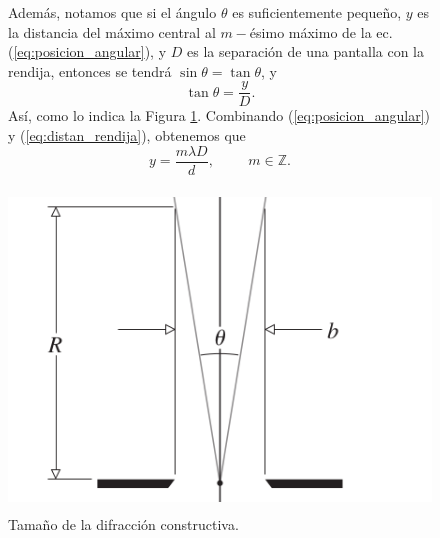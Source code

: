 \documentclass[12pt,a4paper]{article}
\begin{document}
\begin{figure}[hbtp!]
	\begin{minipage}{0.5\linewidth}
		Además, notamos que si el ángulo \(\theta\) es suficientemente pequeño, \(y\) es la distancia del máximo central al \(m-\)ésimo máximo de la ec. (\ref{eq:posicion_angular}), y \(D\) es la separación de una pantalla con la rendija, entonces se tendrá \(\sin \theta = \tan \theta\), y \vspace{-3mm}
		\begin{equation}
			\tan \theta = \dfrac{y}{D}.
			\label{eq:distan_rendija}
		\end{equation}
		Así, como lo indica la Figura \ref{fig:constructiva}. Combinando (\ref{eq:posicion_angular}) y (\ref{eq:distan_rendija}), obtenemos que
		\begin{equation}
			y = \dfrac{m \lambda D}{d} , \hspace{1cm} m \in \mathds{Z} .
			\label{eq:altura}
		\end{equation}
	\end{minipage}\hspace{5mm}
	\begin{minipage}{0.5\linewidth}
		\centering
		\includegraphics[width= \linewidth, height = 8.5cm]{1_INTRO/distancia}
		\caption{Tamaño de la difracción constructiva.}
		\label{fig:constructiva}
	\end{minipage}
\end{figure}
\end{document}

